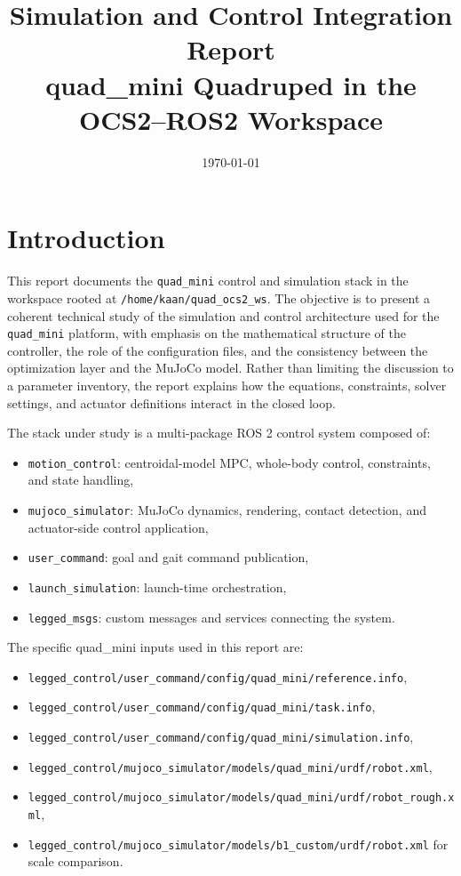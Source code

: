 \documentclass[11pt,a4paper]{article}
\title{Simulation and Control Integration Report\\
quad\_mini Quadruped in the OCS2--ROS2 Workspace}
\author{}
\date{\today}
\newcommand{\code}[1]{\texttt{#1}}
\begin{document}
\maketitle
\tableofcontents
\newpage

\section{Introduction}

This report documents the \code{quad\_mini} control and simulation stack in the workspace rooted at
\code{/home/kaan/quad\_ocs2\_ws}. The objective is to present a coherent technical study of the
simulation and control architecture used for the \code{quad\_mini} platform, with emphasis on the
mathematical structure of the controller, the role of the configuration files, and the consistency
between the optimization layer and the MuJoCo model. Rather than limiting the discussion to a
parameter inventory, the report explains how the equations, constraints, solver settings, and
actuator definitions interact in the closed loop.

The stack under study is a multi-package ROS 2 control system composed of:
\begin{itemize}[leftmargin=*]
  \item \code{motion\_control}: centroidal-model MPC, whole-body control, constraints, and state handling,
  \item \code{mujoco\_simulator}: MuJoCo dynamics, rendering, contact detection, and actuator-side control application,
  \item \code{user\_command}: goal and gait command publication,
  \item \code{launch\_simulation}: launch-time orchestration,
  \item \code{legged\_msgs}: custom messages and services connecting the system.
\end{itemize}

The specific quad\_mini inputs used in this report are:
\begin{itemize}[leftmargin=*]
  \item \code{legged\_control/user\_command/config/quad\_mini/reference.info},
  \item \code{legged\_control/user\_command/config/quad\_mini/task.info},
  \item \code{legged\_control/user\_command/config/quad\_mini/simulation.info},
  \item \code{legged\_control/mujoco\_simulator/models/quad\_mini/urdf/robot.xml},
  \item \code{legged\_control/mujoco\_simulator/models/quad\_mini/urdf/robot\_rough.xml},
  \item \code{legged\_control/mujoco\_simulator/models/b1\_custom/urdf/robot.xml} for scale comparison.
\end{itemize}
\end{document}
